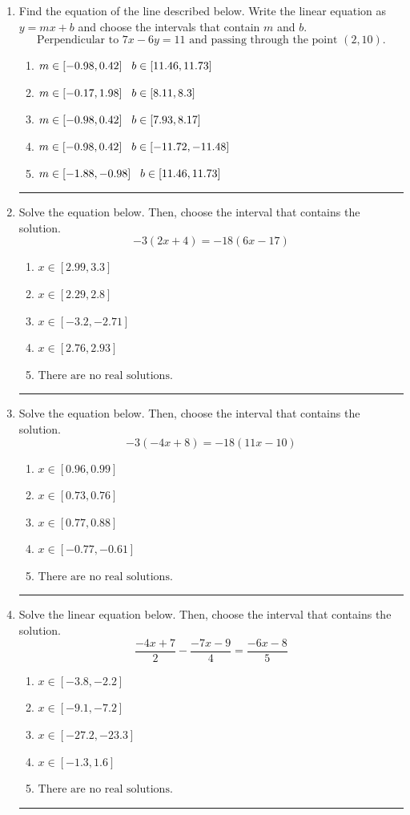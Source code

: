 \documentclass[14pt]{extbook}
\newcommand{\litem}[1]{\item#1\hspace*{-1cm}\rule{\textwidth}{0.4pt}}
\begin{document}
\begin{enumerate}
\litem{
Find the equation of the line described below. Write the linear equation as $ y=mx+b $ and choose the intervals that contain $m$ and $b$.\[ \text{Perpendicular to } 7 x - 6 y = 11 \text{ and passing through the point } (2, 10). \]\begin{enumerate}[label=\Alph*.]
\item \( m \in [-0.98, 0.42] \hspace*{3mm} b \in [11.46, 11.73] \)
\item \( m \in [-0.17, 1.98] \hspace*{3mm} b \in [8.11, 8.3] \)
\item \( m \in [-0.98, 0.42] \hspace*{3mm} b \in [7.93, 8.17] \)
\item \( m \in [-0.98, 0.42] \hspace*{3mm} b \in [-11.72, -11.48] \)
\item \( m \in [-1.88, -0.98] \hspace*{3mm} b \in [11.46, 11.73] \)

\end{enumerate} }
\litem{
Solve the equation below. Then, choose the interval that contains the solution.\[ -3(2x + 4) = -18(6x -17) \]\begin{enumerate}[label=\Alph*.]
\item \( x \in [2.99, 3.3] \)
\item \( x \in [2.29, 2.8] \)
\item \( x \in [-3.2, -2.71] \)
\item \( x \in [2.76, 2.93] \)
\item \( \text{There are no real solutions.} \)

\end{enumerate} }
\litem{
Solve the equation below. Then, choose the interval that contains the solution.\[ -3(-4x + 8) = -18(11x -10) \]\begin{enumerate}[label=\Alph*.]
\item \( x \in [0.96, 0.99] \)
\item \( x \in [0.73, 0.76] \)
\item \( x \in [0.77, 0.88] \)
\item \( x \in [-0.77, -0.61] \)
\item \( \text{There are no real solutions.} \)

\end{enumerate} }
\litem{
Solve the linear equation below. Then, choose the interval that contains the solution.\[ \frac{-4x + 7}{2} - \frac{-7x -9}{4} = \frac{-6x -8}{5} \]\begin{enumerate}[label=\Alph*.]
\item \( x \in [-3.8, -2.2] \)
\item \( x \in [-9.1, -7.2] \)
\item \( x \in [-27.2, -23.3] \)
\item \( x \in [-1.3, 1.6] \)
\item \( \text{There are no real solutions.} \)


\end{enumerate}}
\end{enumerate}
\end{document}
